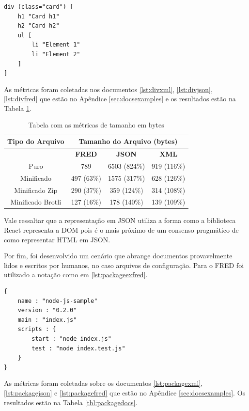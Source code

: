 \begin{lstlisting}[caption=Exemplo de dado representando HTML,label={lst:divexfred}]
div (class="card") [
    h1 "Card h1"
    h2 "Card h2"
    ul [
        li "Element 1"
        li "Element 2"
    ]
]
\end{lstlisting}

As métricas foram coletadas nos documentos \ref{lst:divxml}, \ref{lst:divjson},
\ref{lst:divfred} que estão no Apêndice \ref{sec:docsexamples} 
e os resultados estão na Tabela \ref{tbl:divdocs}.

\begin{table}[h]
    \centering
	\caption{Tabela com as métricas de tamanho em bytes}
	\label{tbl:divdocs}
    \begin{tabular}{cccc}
        \toprule
        \multicolumn{1}{c}{\textbf{Tipo do Arquivo}} & \multicolumn{3}{c}{\textbf{Tamanho do Arquivo (bytes)}} \\
        \midrule
                                                     & \textbf{FRED} & \textbf{JSON} & \textbf{XML}    \\
        \midrule
        Puro  & 789 & 6503 (824\%) & 919 (116\%)\\
		Minificado & 497 (63\%) & 1575 (317\%) & 628 (126\%) \\
        Minificado Zip & 290 (37\%) & 359 (124\%) & 314 (108\%) \\
        Minificado Brotli & 127 (16\%) & 178 (140\%) & 139 (109\%) \\
		\bottomrule
    \end{tabular}
\end{table}

Vale ressaltar que a representação em JSON utiliza a forma como a biblioteca React
representa a DOM pois é o mais próximo de um consenso pragmático
de como representar HTML em JSON.

Por fim, foi desenvolvido um cenário que abrange documentos provavelmente
lidos e escritos por humanos, no caso arquivos de configuração. Para o 
FRED foi utilizado a notação como em \ref{lst:packageexfred}.

\begin{lstlisting}[caption=Exemplo de documento para arquivo de configuração ,label={lst:packageexfred}]
{
    name : "node-js-sample"
    version : "0.2.0"
    main : "index.js"
    scripts : {
        start : "node index.js"
        test : "node index.test.js"
    }
}
\end{lstlisting}

As métricas foram coletadas sobre os documentos \ref{lst:packagexml}, \ref{lst:packagejson} e 
\ref{lst:packagefred} que estão no Apêndice \ref{sec:docsexamples}.
Os resultados estão na Tabela \ref{tbl:packagedocs}. 

